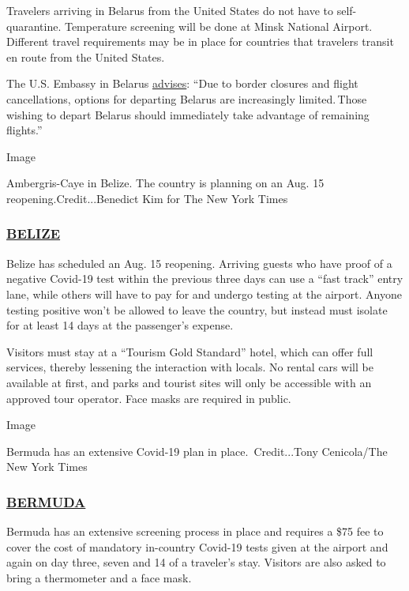 Travelers arriving in Belarus from the United States do not have to
self-quarantine. Temperature screening will be done at Minsk National
Airport. Different travel requirements may be in place for countries
that travelers transit en route from the United States.

The U.S. Embassy in Belarus
\href{https://by.usembassy.gov/u-s-citizen-services/covid-19-information/}{advises}:
``Due to border closures and flight cancellations, options for departing
Belarus are increasingly limited.\,Those wishing to depart Belarus
should immediately take advantage of remaining flights.''

Image

Ambergris-Caye in Belize. The country is planning on an Aug. 15
reopening.Credit...Benedict Kim for The New York Times

\hypertarget{belize}{%
\subsubsection{\texorpdfstring{\href{https://belizetourismboard.org/belize-covid-19-update-for-travellers/}{BELIZE}}{BELIZE}}\label{belize}}

Belize has scheduled an Aug. 15 reopening. Arriving guests who have
proof of a negative Covid-19 test within the previous three days can use
a ``fast track'' entry lane, while others will have to pay for and
undergo testing at the airport. Anyone testing positive won't be allowed
to leave the country, but instead must isolate for at least 14 days at
the passenger's expense.

Visitors must stay at a ``Tourism Gold Standard'' hotel, which can offer
full services, thereby lessening the interaction with locals. No rental
cars will be available at first, and parks and tourist sites will only
be accessible with an approved tour operator. Face masks are required in
public.

Image

Bermuda has an extensive Covid-19 plan in place.~Credit...Tony
Cenicola/The New York Times

\hypertarget{bermuda}{%
\subsubsection{\texorpdfstring{\href{https://www.gotobermuda.com/bta/press-release/bermuda-tourism-authority-update}{BERMUDA}}{BERMUDA}}\label{bermuda}}

Bermuda has an extensive screening process in place and requires a \$75
fee to cover the cost of mandatory in-country Covid-19 tests given at
the airport and again on day three, seven and 14 of a traveler's stay.
Visitors are also asked to bring a thermometer and a face mask.

